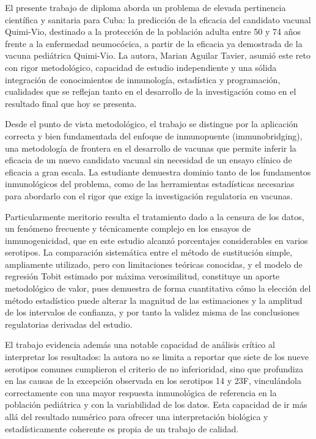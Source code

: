 \begin{opinion}
    El presente trabajo de diploma aborda un problema de elevada pertinencia científica y sanitaria para Cuba: la predicción de la eficacia del candidato vacunal Quimi-Vio, destinado a la protección de la población adulta entre 50 y 74 años frente a la enfermedad neumocócica, a partir de la eficacia ya demostrada de la vacuna pediátrica Quimi-Vio. La autora, Marian Aguilar Tavier, asumió este reto con rigor metodológico, capacidad de estudio independiente y una sólida integración de conocimientos de inmunología, estadística y programación, cualidades que se reflejan tanto en el desarrollo de la investigación como en el resultado final que hoy se presenta.
    
    Desde el punto de vista metodológico, el trabajo se distingue por la aplicación correcta y bien fundamentada del enfoque de inmunopuente (immunobridging), una metodología de frontera en el desarrollo de vacunas que permite inferir la eficacia de un nuevo candidato vacunal sin necesidad de un ensayo clínico de eficacia a gran escala. La estudiante demuestra dominio tanto de los fundamentos inmunológicos del problema, como de las herramientas estadísticas necesarias para abordarlo con el rigor que exige la investigación regulatoria en vacunas.
    
    Particularmente meritorio resulta el tratamiento dado a la censura de los datos, un fenómeno frecuente y técnicamente complejo en los ensayos de inmunogenicidad, que en este estudio alcanzó porcentajes considerables en varios serotipos. La comparación sistemática entre el método de sustitución simple, ampliamente utilizado, pero con limitaciones teóricas conocidas, y el modelo de regresión Tobit estimado por máxima verosimilitud, constituye un aporte metodológico de valor, pues demuestra de forma cuantitativa cómo la elección del método estadístico puede alterar la magnitud de las estimaciones y la amplitud de los intervalos de confianza, y por tanto la validez misma de las conclusiones regulatorias derivadas del estudio.
    
    El trabajo evidencia además una notable capacidad de análisis crítico al interpretar los resultados: la autora no se limita a reportar que siete de los nueve serotipos comunes cumplieron el criterio de no inferioridad, sino que profundiza en las causas de la excepción observada en los serotipos 14 y 23F, vinculándola correctamente con una mayor respuesta inmunológica de referencia en la población pediátrica y con la variabilidad de los datos. Esta capacidad de ir más allá del resultado numérico para ofrecer una interpretación biológica y estadísticamente coherente es propia de un trabajo de calidad.
    

\end{opinion}
